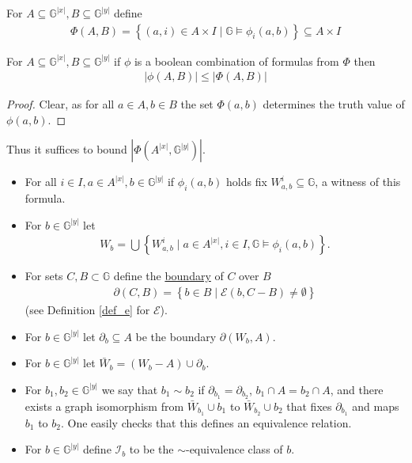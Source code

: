 \documentclass{amsart}
\newcommand{\II}{\mathscr I}
\newcommand{\GG}{\mathbb G}
\newcommand{\GGY}{\GG^{|y|}}
\newcommand{\AX}{A^{|x|}}
\newcommand{\defn}{\underline}
\newcommand{\ppp}{\partial}
\newcommand{\E}{\mathscr E}
\newcommand{\curly}[1]{\left\{#1\right\}}
\newcommand{\abs}[1]{\left|#1\right|}
\begin{document}
\begin{Definition}
  For $A \subseteq \GG^{|x|}, B \subseteq \GG^{|y|}$ define
  \begin{align*}
    \Phi(A, B) = \curly{(a, i) \in A \times I \mid \GG \models \phi_i(a, b)} \subseteq A \times I
  \end{align*}  
\end{Definition}

\begin{Lemma}
  For $A \subseteq \GG^{|x|}, B \subseteq \GG^{|y|}$
  if $\phi$ is a boolean combination of formulas from $\Phi$ then
  \begin{align*}
    \abs{\phi(A, B)} \leq \abs{\Phi(A, B)}
  \end{align*}  
\end{Lemma}
\begin{proof}
  Clear, as for all $a \in A, b \in B$ the set $\Phi(a,b)$ determines the truth value of $\phi(a,b)$.
\end{proof}

Thus it suffices to bound  $\abs{\Phi(\AX, \GGY)}$.

\begin{Definition} \;
  \begin{itemize}
  \item For all $i \in I, a \in \AX, b \in \GGY$ if $\phi_i(a, b)$ holds fix $W^i_{a,b} \subseteq \GG$, a witness of this formula.
  \item For $b \in \GGY$ let 
    \begin{align*}
      W_b = \bigcup \curly{W^i_{a,b} \mid a \in \AX, i \in I, \GG \models \phi_i(a,b)}.
    \end{align*}
  \item For sets $C, B \subset \GG$ define the \defn{boundary} of $C$ over $B$
    \begin{align*}
      \partial(C, B) = \curly{b \in B \mid \E(b, C - B) \neq \emptyset}
    \end{align*}
    (see Definition \ref{def_e} for $\E$).
  \item For $b \in \GGY$ let $\partial_b \subseteq A$ be the boundary $\partial(W_b, A)$.
  \item For $b \in \GGY$ let $\bar W_b = (W_b - A) \cup \ppp_b$.
  \item For $b_1, b_2 \in \GGY$ we say that $b_1 \sim b_2$ if $\ppp_{b_1} = \ppp_{b_2}$,
    $b_1 \cap A = b_2 \cap A$,
    and there exists a graph isomorphism from $\bar W_{b_1} \cup b_1$ to $\bar W_{b_2} \cup b_2$ that fixes $\ppp_{b_1}$ and
    maps $b_1$ to $b_2$.
    One easily checks that this defines an equivalence relation.
  \item For $b \in \GGY$ define $\II_b$ to be the $\sim$-equivalence class of $b$.
  \end{itemize}
\end{Definition}
\end{document}
